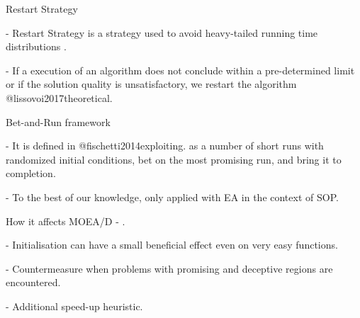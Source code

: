  Restart Strategy 


- Restart Strategy is a strategy used to avoid heavy-tailed running time distributions \cite{gomes2000heavy}.

-  If a execution of an algorithm does not conclude within a pre-determined limit or if the solution quality is unsatisfactory, we restart the algorithm @lissovoi2017theoretical.


Bet-and-Run framework 

- It is defined in @fischetti2014exploiting. as a number of short runs with randomized initial conditions, bet on the most promising run, and bring it to completion.

- To the best of our knowledge, only applied with EA in the context of SOP.

How it affects MOEA/D - \cite{lissovoi2017theoretical}.

- Initialisation can have a small beneficial effect even on very easy functions.

- Countermeasure when problems with promising and deceptive regions are encountered.

- Additional speed-up heuristic.